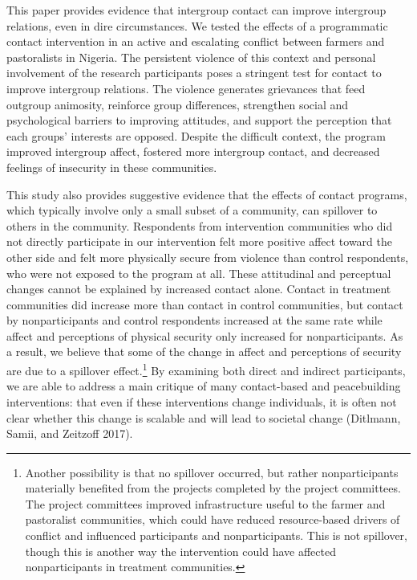\documentclass[11pt]{article}
\begin{document}
This paper provides evidence that intergroup contact can improve
intergroup relations, even in dire circumstances. We tested the effects
of a programmatic contact intervention in an active and escalating
conflict between farmers and pastoralists in Nigeria. The persistent
violence of this context and personal involvement of the research
participants poses a stringent test for contact to improve intergroup
relations. The violence generates grievances that feed outgroup
animosity, reinforce group differences, strengthen social and
psychological barriers to improving attitudes, and support the
perception that each groups' interests are opposed. Despite the
difficult context, the program improved intergroup affect, fostered more
intergroup contact, and decreased feelings of insecurity in these
communities.

This study also provides suggestive evidence that the effects of contact
programs, which typically involve only a small subset of a community,
can spillover to others in the community. Respondents from intervention
communities who did not directly participate in our intervention felt
more positive affect toward the other side and felt more physically
secure from violence than control respondents, who were not exposed to
the program at all. These attitudinal and perceptual changes cannot be
explained by increased contact alone. Contact in treatment communities
did increase more than contact in control communities, but contact by
nonparticipants and control respondents increased at the same rate while
affect and perceptions of physical security only increased for
nonparticipants. As a result, we believe that some of the change in
affect and perceptions of security are due to a spillover
effect.\footnote{Another possibility is that no spillover occurred, but
  rather nonparticipants materially benefited from the projects
  completed by the project committees. The project committees improved
  infrastructure useful to the farmer and pastoralist communities, which
  could have reduced resource-based drivers of conflict and influenced
  participants and nonparticipants. This is not spillover, though this
  is another way the intervention could have affected nonparticipants in
  treatment communities.} By examining both direct and indirect
participants, we are able to address a main critique of many
contact-based and peacebuilding interventions: that even if these
interventions change individuals, it is often not clear whether this
change is scalable and will lead to societal change (Ditlmann, Samii,
and Zeitzoff 2017).
\end{document}
